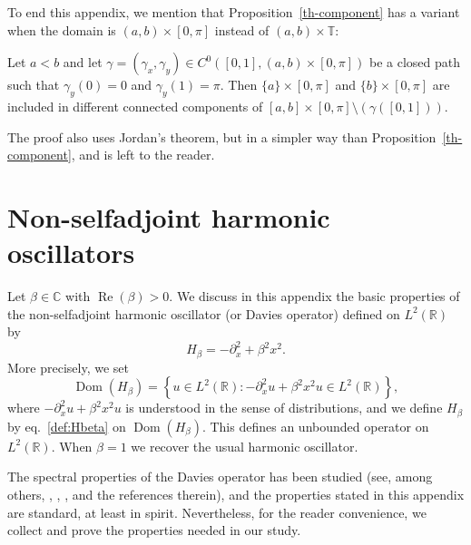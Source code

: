 \documentclass[AHL,Unicode,longabstracts,published]{cedram}
\newcommand{\set}[1]{\left\{ #1 \right\}}
\newcommand{\1}{\mathds 1}
\DeclareMathOperator{\Ree}{Re}
\DeclareMathOperator{\Dom}{Dom}
\newcommand{\R}{\mathbb{R}}
\newcommand{\C}{\mathbb{C}}
\newcommand{\T}{\mathbb{T}}
\renewcommand{\b}{\beta}
\newcommand{\g}{\gamma}
\DeclareMathOperator{\Ree}{Re}
\begin{document}
To end this appendix, we mention that Proposition~\ref{th-component} has a variant when the domain is $(a,b)\times [0,\pi]$ instead of $(a,b)\times \T$:

\begin{prop}\label{th-component-segment}
Let $a<b$ and let $\g = (\g_x,\g_y) \in C^0([0,1], (a,b)\times [0,\pi])$ be a closed path such that $\g_y(0) = 0$ and $\g_y(1) = \pi$. Then $\{a\}\times [0,\pi]$ and $\{b\}\times [0,\pi]$ are included in different connected components of $[a,b]\times[0,\pi] \setminus (\g([0,1]))$.
\end{prop}

The proof also uses Jordan's theorem, but in a simpler way than Proposition~\ref{th-component}, and is left to the reader.

\section{Non-selfadjoint harmonic oscillators} \label{sec:Davies-operator}

Let $\b \in \C$ with $\Ree(\b) > 0$. We discuss in this appendix the basic properties of the non-selfadjoint harmonic oscillator (or Davies operator) defined on $L^2(\R)$ by
\begin{equation}\label{def:Hbeta}
H_\beta = - \partial_x^2 + \beta^2 x^2.
\end{equation}
More precisely, we set
\[
\Dom(H_\beta) = \set{u \in L^2(\R) \colon {-}\partial_x^2 u + \beta^2 x^2 u \in L^2(\R)},
\]
where $-\partial_x^2 u + \beta^2 x^2 u$ is understood in the sense of distributions, and we define $H_\b$ by eq.~\eqref{def:Hbeta} on $\Dom(H_\beta)$. This defines an unbounded operator on $L^2(\R)$. When $\b = 1$ we recover the usual harmonic oscillator.

The spectral properties of the Davies operator has been studied (see, among others, \cite[\S~14.5]{Davies07}, \cite[\S~14.4]{Helffer13}, \cite{KSTV15}, and the references therein), and the properties stated in this appendix are standard, at least in spirit. Nevertheless, for the reader convenience, we collect and prove the properties needed in our study.
\end{document}

